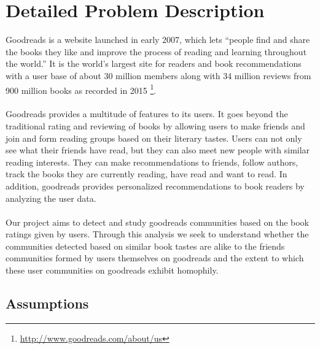\documentclass[11pt]{article}
\begin{document}
\maketitle

\section{Detailed Problem Description}
Goodreads is a website launched in early 2007, which lets ``people find and share the books they like and improve the process of reading and learning throughout the world.'' It is the world's largest site for readers and book recommendations with a user base of about 30 million members along with 34 million reviews from 900 million books as recorded in 2015 \footnote{\url{http://www.goodreads.com/about/us}}.\\\\
Goodreads provides a multitude of features to its users. It goes beyond the traditional rating and reviewing of books by allowing users to make friends and join and form reading groups based on their literary tastes.
Users can not only see what their friends have read, but they can also meet new people with similar reading interests. They can make recommendations to friends, follow authors, track the books they are currently reading, have read and want to read. In addition, goodreads provides personalized recommendations to book readers by analyzing the user data.\\\\
Our project aims  to detect and study goodreads communities based on the book ratings given by users. Through this analysis we seek to understand whether the communities detected based on similar book tastes are alike to the friends communities formed by users themselves on goodreads and the extent to which these user communities on goodreads exhibit homophily.
\subsection{Assumptions}
\end{document}
